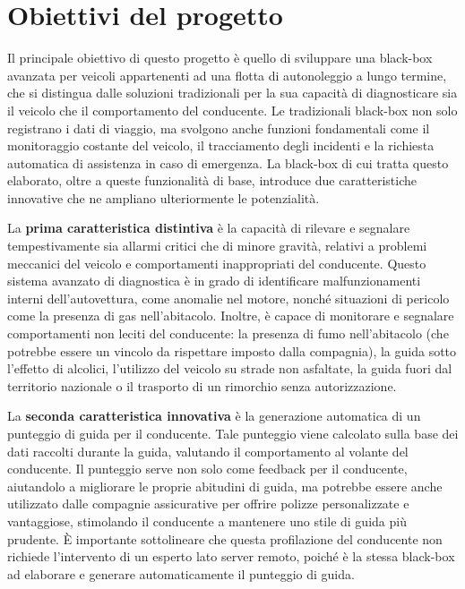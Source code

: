 \documentclass[12pt, a4paper, italian]{report}
\numberwithin{figure}{chapter}
\numberwithin{table}{chapter}
\begin{document}
\section{Obiettivi del progetto}
Il principale obiettivo di questo progetto è quello di sviluppare una black-box avanzata per veicoli appartenenti ad una flotta di autonoleggio a lungo termine, che si distingua dalle soluzioni tradizionali per la sua capacità di diagnosticare sia il veicolo che il comportamento del conducente. Le tradizionali black-box non solo registrano i dati di viaggio, ma svolgono anche funzioni fondamentali come il monitoraggio costante del veicolo, il tracciamento degli incidenti e la richiesta automatica di assistenza in caso di emergenza. La black-box di cui tratta questo elaborato, oltre a queste funzionalità di base, introduce due caratteristiche innovative che ne ampliano ulteriormente le potenzialità.

\vspace{1cm}

La \textbf{prima caratteristica distintiva} è la capacità di rilevare e segnalare tempestivamente sia allarmi critici che di minore gravità, relativi a problemi meccanici del veicolo e comportamenti inappropriati del conducente. Questo sistema avanzato di diagnostica è in grado di identificare malfunzionamenti interni dell'autovettura, come anomalie nel motore, nonché situazioni di pericolo come la presenza di gas nell'abitacolo. Inoltre, è capace di monitorare e segnalare comportamenti non leciti del conducente: la presenza di fumo nell'abitacolo (che potrebbe essere un vincolo da rispettare imposto dalla compagnia), la guida sotto l'effetto di alcolici, l'utilizzo del veicolo su strade non asfaltate, la guida fuori dal territorio nazionale o il trasporto di un rimorchio senza autorizzazione.

\vspace{1cm}

La \textbf{seconda caratteristica innovativa} è la generazione automatica di un punteggio di guida per il conducente. Tale punteggio viene calcolato sulla base dei dati raccolti durante la guida, valutando il comportamento al volante del conducente. Il punteggio serve non solo come feedback per il conducente, aiutandolo a migliorare le proprie abitudini di guida, ma potrebbe essere anche utilizzato dalle compagnie assicurative per offrire polizze personalizzate e vantaggiose, stimolando il conducente a mantenere uno stile di guida più prudente. È importante sottolineare che questa profilazione del conducente non richiede l'intervento di un esperto lato server remoto, poiché è la stessa black-box ad elaborare e generare automaticamente il punteggio di guida.
\end{document}
